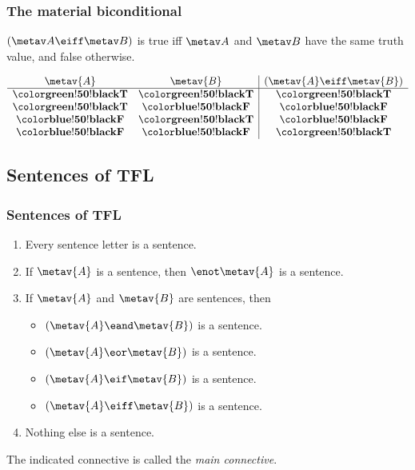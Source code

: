 \begin{frame}
  \frametitle{The material biconditional \eiff}
  
  \begin{definition}
    $(\metav A \eiff \metav B)$ is true iff $\metav A$ and
    $\metav B$ have the same truth value, and false otherwise.
    \end{definition}
  \[
  \begin{array}{cc|c}
  \metav{A} & \metav{B} & (\metav{A} \eiff \metav{B})\\
  \hline
  \True & \True & \True\\
  \True & \False & \False\\
  \False & \True & \False\\
  \False & \False & \True
  \end{array}
  \]
  
\end{frame}

\subsection{Sentences of TFL}

\begin{frame}
\frametitle{Sentences of TFL}

  \begin{definition}
  \begin{enumerate}
  \item Every sentence letter is a sentence.
  \item If $\metav{A}$ is a sentence, then $\enot\metav{A}$ is a sentence.
  \item If $\metav{A}$ and $\metav{B}$ are sentences, then
  \begin{itemize}
  \item $(\metav{A}\eand\metav{B})$ is a sentence.
  \item $(\metav{A}\eor\metav{B})$ is a sentence.
  \item $(\metav{A}\eif\metav{B})$ is a sentence.
  \item $(\metav{A}\eiff\metav{B})$ is a sentence.
  \end{itemize}
  \item Nothing else is a sentence.
  \end{enumerate}
  \end{definition}

  The indicated connective is called the \emph{main connective}.
\end{frame}

